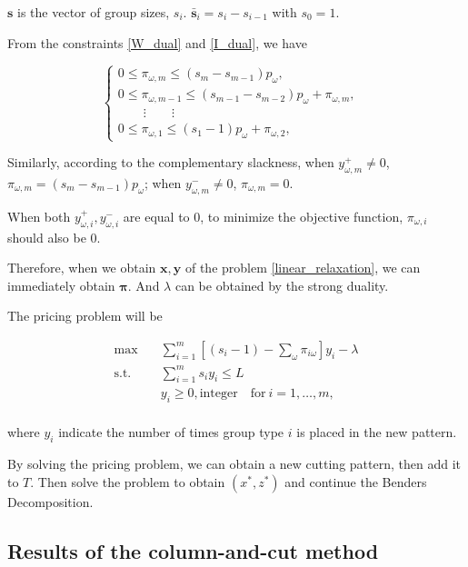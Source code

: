 $\mathbf{s}$ is the vector of group sizes, $s_i$. $\mathbf{\bar{s}}_{i} = s_i - s_{i-1}$ with $s_0 =1$.


From the constraints \eqref{W_dual} and \eqref{I_dual}, we have 

\begin{equation}
  \left\{
    \begin{array}{lr}
    0 \leq \pi_{\omega,m} \leq (s_m -s_{m-1})p_{\omega}, &  \\
    0 \leq \pi_{\omega, m-1} \leq (s_{m-1} -s_{m-2})p_{\omega}+ \pi_{\omega,m}, &  \\
    \qquad \vdots \qquad \vdots &  \\
    0 \leq \pi_{\omega,1} \leq (s_{1} - 1)p_{\omega}+ \pi_{\omega,2}, &
    \end{array}
  \right.
\end{equation}

Similarly, according to the complementary slackness,
when $y_{\omega,m}^{+} \neq 0$, $\pi_{\omega,m} = (s_m -s_{m-1})p_{\omega}$; when $y_{\omega,m}^{-} \neq 0$, $\pi_{\omega,m} = 0$. 

When both $y_{\omega,i}^{+}, y_{\omega,i}^{-}$ are equal to 0, to minimize the objective function, $\pi_{\omega,i}$ should also be 0.

Therefore, when we obtain $\mathbf{x},\mathbf{y}$ of the problem \eqref{linear_relaxation}, we can immediately obtain $\mathbf{\pi}$. And $\lambda$ can be obtained by the strong duality.

The pricing problem will be

\[\begin{split}\mbox{max}\quad & \sum_{i=1}^m \left[(s_i-1) -\sum_{\omega}\pi_{i \omega}\right] y_{i} - \lambda \\
  \mbox{s.t.} \quad & \sum_{i=1}^m s_i y_i \leq L  \\
  & y_i \geq 0, \mbox{integer}\quad \mbox{for}~ i=1,\ldots,m,\\
\end{split}\]

where $y_i$ indicate the number of times group type $i$ is placed in the new pattern.

By solving the pricing problem, we can obtain a new cutting pattern, then add it to $T$. Then solve the problem to obtain $(x^{*}, z^{*})$ and continue the Benders Decomposition.

\subsection{Results of the column-and-cut method}

